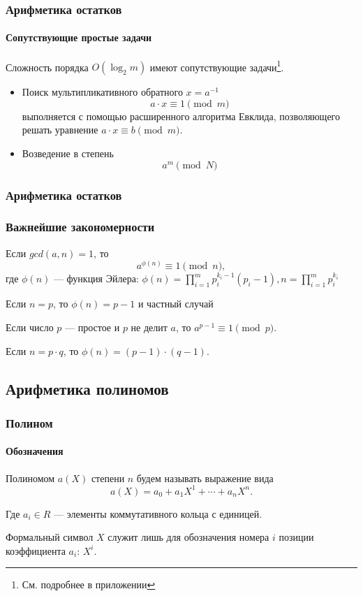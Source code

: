 \begin{frame}
    \frametitle{Арифметика остатков}
    \framesubtitle{Сопутствующие простые задачи}
    
    Сложность порядка $O(\log_2m)$ имеют сопутствующие задачи\footnote{См. подробнее в приложении}. 
    \begin{itemize}
        \item Поиск мультипликативного обратного $x=a^{-1}$
            \[a\cdot x\equiv 1\pmod{m}\]
        выполняется с помощью расширенного алгоритма Евклида, позволяющего решать уравнение $a\cdot x\equiv b\pmod{m}$.
        \item Возведение в степень
            \[a^m\pmod{N}\]
    \end{itemize}
\end{frame}


\begin{frame}
    \frametitle{Арифметика остатков}
    \frametitle{Важнейшие закономерности}

    \begin{theorem}
        Если $gcd(a,n)=1$, то 
        \[a^{\phi(n)}\equiv 1\pmod{n},\] 
        где $\phi(n)$ --- \alert{функция Эйлера}:
        \(
            \displaystyle
            \phi(n)=\prod_{i=1}^{m}p_i^{k_i-1}(p_i-1), n=\prod_{i=1}^{m}p_i^{k_i}
        \)
    \end{theorem}

    Если $n=p$, то $\phi(n)=p-1$ и частный случай
    \begin{theorem}
        Если число $p$ --- простое и $p$ не делит $a$, то $a^{p-1}\equiv 1\pmod{p}$.
    \end{theorem}
    
    Если $n=p\cdot q$, то $\phi(n)=(p-1)\cdot(q-1)$.
\end{frame}


\subsection{Арифметика полиномов}


\begin{frame}
    \frametitle{Полином}
    \framesubtitle{Обозначения}
    \alert{Полиномом} $a(X)$ степени $n$ будем называть выражение вида 
    \[ a(X)=a_0+a_1X^1+\cdots +a_nX^n. \]
    
    Где $a_i\in R$ --- элементы коммутативного \alert{кольца} с единицей.

    \alert{Формальный символ} $X$ служит лишь для обозначения номера $i$ позиции \alert{коэффициента} $a_i$: $X^i$.
\end{frame}


